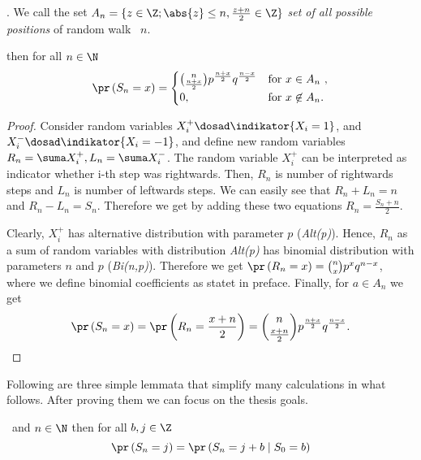\begin{defn}\label{defn-set_all_possible_values}
 \Lrw. We call the set $A_n=\{z \in \Z; \abs{z}\leq n, \frac{z+n}{2}\in \Z \}$ \emph{set of all possible positions} of random walk \rw\ \intime $n$.
\end{defn}


\begin{thm}\label{thm-probability_position_time}
 \Lrw then for all $n \in \N$
 \[
 \pr \left( S_n=x \right) =
 \begin{cases}
 \binom{n}{\frac{n+x}{2}}p^{\frac{n+x}{2}}q^{\frac{n-x}{2}} & \text{for $x \in A_n$ },\\
 0, & \text{for $x \not\in A_n$}.
 \end{cases}
 \]

\end{thm}

\begin{proof}
  Consider random variables $X_{i}^{+}\dosad \indikator{X_i=1}$, and
   $X_{i}^{-}\dosad \indikator{X_i=-1}$, and define new random variables
   $R_n=\suma X_{i}^{+}, L_n=\suma X_{i}^{-}$.  The
   random variable $X_{i}^{+}$ can be interpreted as indicator
   whether i-th step was rightwards. Then, $R_n$ is number of
   rightwards steps and $L_n$ is number of leftwards steps. We can
   easily see that $R_n+L_n=n$ and $R_n-L_n=S_n$.  Therefore we get by
   adding these two equations $R_n=\frac{S_n+n}{2}.$

   Clearly, $X_{i}^{+}$ has alternative distribution with
   parameter $p$ (\textit{Alt(p)}). Hence, $R_n$ as a sum of \iid
   random variables with distribution \textit{Alt(p)} has binomial
   distribution with parameters $n$ and $p$ (\textit{Bi(n,p)}).
   Therefore we get
   $\pr \left(R_n=x \right) =\binom{n}{x}p^{x}q^{n-x}$, where we define
  binomial coefficients as statet in preface.
   Finally, for $a \in A_n$ we get
   \[
     \pr \left( S_n=x \right) =\pr\left( R_n=\frac{x+n}{2} \right) =
     \binom{n}{\frac{x+n}{2}}p^{\frac{n+x}{2}}q^{\frac{n-x}{2}}.
   \]
\end{proof}

\begin{rem}
  Following are three simple lemmata that simplify many calculations in what follows. After proving them we can focus on the thesis goals.
\end{rem}

\begin{lemma}\label{lemma-spatial_homogeneity}
  \Lrw\ and $n \in \N$ then for all $b,j \in \Z$
\[
  \pr \left( S_n=j \right) =\pr \left( S_n=j+b \mid
    S_0=b \right)
\]
\end{lemma}

